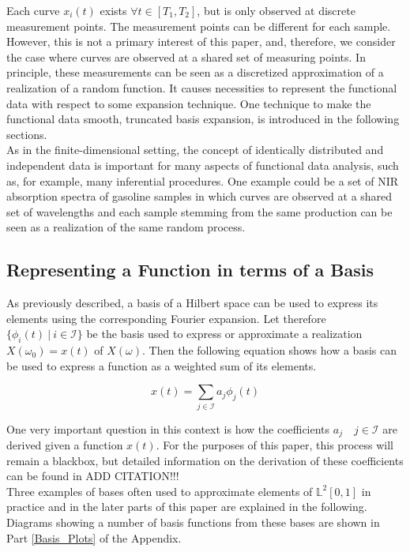 \documentclass[11pt,twoside,a4paper]{article}
\begin{document}
	Each curve $x_i(t)$ exists $\forall t \in [T_1, T_2]$, but is only observed at discrete measurement points. The measurement points can be different for each sample. However, this is not a primary interest of this paper, and, therefore, we consider the case where curves are observed at a shared set of measuring points. In principle, these measurements can be seen as a discretized approximation of a realization of a random function. It causes necessities to represent the functional data with respect to some expansion technique. One technique to make the functional data smooth, truncated basis expansion, is introduced in the following sections.\\
	As in the finite-dimensional setting, the concept of identically distributed and independent data is important for many aspects of functional data analysis, such as, for example, many inferential procedures. One example could be a set of NIR absorption spectra of gasoline samples in which curves are observed at a shared set of wavelengths and each sample stemming from the same production can be seen as a realization of the same random process.
	
	\subsection{Representing a Function in terms of a Basis} 
	As previously described, a basis of a Hilbert space can be used to express its elements using the corresponding Fourier expansion. Let therefore $\{\phi_i(t) \: \vert \: i \in \mathcal{I}\}$ be the basis used to express or approximate a realization $X(\omega_0) = x(t)$ of $X(\omega)$. Then the following equation shows how a basis can be used to express a function as a weighted sum of its elements.
	
	\begin{equation}
		x(t) = \sum_{j \in \mathcal{I}} a_j \phi_j(t) 
	\end{equation}
	
	One very important question in this context is how the coefficients $a_j \quad j \in \mathcal{I}$ are derived given a function $x(t)$. For the purposes of this paper, this process will remain a blackbox, but detailed information on the derivation of these coefficients can be found in {\color{red} ADD CITATION!!!} \\
	Three examples of bases often used to approximate elements of $\mathbb{L}^2[0,1]$ in practice and in the later parts of this paper are explained in the following. Diagrams showing a number of basis functions from these bases are shown in Part \ref{Basis_Plots} of the Appendix.
	
\end{document}
